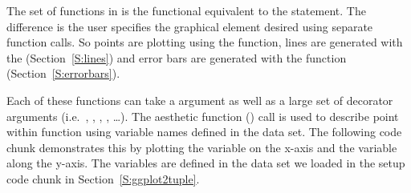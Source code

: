 \documentclass[nojss, letterpaper]{jss}\usepackage[]{graphicx}\usepackage[]{color}
\begin{document}
The  set of functions in  is the functional equivalent to the  statement. The difference is the user specifies the graphical element desired using separate function calls. So points are plotting using the  function, lines are generated with the  (Section~\ref{S:lines}) and error bars are generated with the  function (Section~\ref{S:errorbars}).

Each of these functions can take a  argument as well as a large set of decorator arguments (i.e.\ , , , , \ldots). The aesthetic function () call is used to describe point within   function using variable names defined in the data set. The following code chunk demonstrates this by plotting the  variable on the x-axis and the  variable along the y-axis. The variables are defined in the  data set we loaded in the setup code chunk in Section~\ref{S:ggplot2tuple}.
\end{document}
